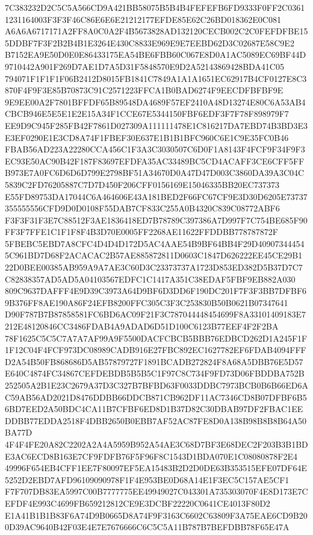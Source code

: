 \documentclass[UTF8,fontset=fandol,zihao=-4,a4paper]{ctexart}
\begin{document}
{{7C383232D2C5C5A566CD9A421BB58075B5B4B4FEFEFB6FD9333F0FF2C03611231164003F3F3F46C86E6E6E21212177EFDE85E62C26BD018362E0C081
A6A6A6717171A2FF8A0C0A2F4B5673828AD132120CECB002C2C0FEFDFBE155DDBF7F3F2B2B4B1E3264E430C8833E969E9E7EEBD62D3C02687E58C9E2
B7152EA9E50D0E0E86433175EA54BE6FBB60C067E8D0A1AC5089EC69BF44D9710442A901F269D7AE1D7A5D31F5848570E9D2A52143869428BDA41C05
794071F1F1F1F06B2412D8015FB1841C7849A1A1A1651EC62917B4CF0127E8C3870F4F9F3E85B70873C91C2571223FFCA1B0BAD6274F9EECDFBFBF9E
9E9EE00A2F7801BFFDF65B89548DA4689F57EF2410A48D13274E80C6A53AB4CBCB946E5E5E1E2E15A34F1CCE67E5344150FBF6EDF3F7F78F898979F7
EE9D9C945F285FB42F7861D027309A111111478E1C816217DA7EBD74B3BD3E3E3EF0290E1E3CD8A74F1FBEF30E637E1B1B1BFC960C6E1C9E35FC0B46
FBAB56AD223A22280CCA456C1F3A3C3030507C6D0F1A8143F4FCF9F34F9F3EC93E50AC90B42F187F83697EFDFA35AC33489BC5CD4ACAFF3CE6CFF5FF
B973E7A0FC6D6D6D799E2798BF51A34670D0A47D47D003C3860DA39A3C04C5839C2FD76205887C7D7D450F206CFF0156169E15046335BB20EC737373
E55FD89753DA17044C6A464606E43A181BED2F66FC67CF9E3D30D6205E73737355555556CFD9D0D0108F55DAB7CF833C255A0B4320C839C08772ABF6
F3F3F31F3E7C88512F3AE1836418ED7B78789C397386A7D997F7C754BE685F90FF3F7FFE1C1F1F8F4B3D70E0005FF2268AE11622FFDDBB778787872F
5FBEBC5EBD7A8CFC4D4D4D172D5AC4AAE54B9BF64BB4F29D409073444545C961BD7D68F2ACACAC2B57AE885872811D0603C1847D626222EE45CE29B1
22D0BEE00385AB959A9A7AE3C60D3C23373737A1723D853ED382D5B37D7C7C82838357AD5AD5A04103567EDFC1C1417A351C38EDAF5FBF9EB882A030
809C9637DAFFF4E9D39C3973A64D9BF6D3DD6F190DC201F7F3F3BB7DFBF69B376FF8AE190A86F24EFB8200FFC305C3F3C253830B50B0621B07347641
D90F787B7B87858581FC6BD6AC09F21F3C787044448454699F8A33101409183E7212E48120846CC3486FDAB4A9ADAD6D51D100C6123B77EEF4F2F2BA
78F1625C5C5C7A7A7AF99A9F5500DACFCBCB5BBB76EDBCD262D1A245F1F1F12C04F4FCF973DC08989CADB916E27FBC892EC1627782EF6FDAB4094FFF
D2A54B50FB868686D5AB57879727F1891BCADB272824F8A68A5DBB76E5D57E640C4874FC34867CEFDEBDB5B5B5C1F97C8C734F9FD73D06FBDDBA752B
252505A2B1E23C2679A37D3C327B7BFBD63F0033DDBC7973BCB0B6B66ED6AC59AB56AD2021D8476DDBB66DDCB871CB962DF11AC7346CD8B07DFBF6B5
6BD7EED2A50BDC4CA11B7CFBF6ED8D1B37D82C30DBAB97DF2FBAC1EEDDBB77EDDA2518F4DBB2650B0EBB7AF52AC87FE8D0A138B98B8B8B64A50BA77D
4F4F4FE20A82C2202A2A4A5959B952A54AE3C68D7BF3E68DEC2F203B3B1BDE3AC6ECD8B163E7CF9FDFB76F5F96F8C1543D1BDA070E1C08080878F2E4
49996F654EB4CFF1EE7F80097EF5EA15483B2D2D0DE63B353515EFE07DF64E5252D2EBD7AFD96109090978F1F4E953BE0D68A14E1F3EC5C157AE5CF1
F7F707DB83EA5997C00B7777775EE49949027C043301A735303070F4E8D173E7CEFDF4E993C4699FB659212812CE9E3DCBF22220C0641CE4013F80D2
E1A41B1B1B83F6A74D9B0665D8A74F9F3163C6602C63809F3A75EAE6CD9B200D39AC9640B42F03E4E7E7676666C6C5C5A11B787B7BEFDBB78F65E47A
}}
\end{document}
